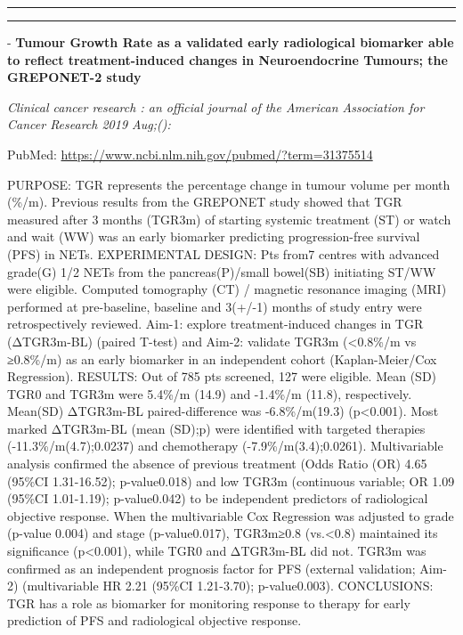 \documentclass[]{article}
\begin{document}
\begin{center}\rule{0.5\linewidth}{\linethickness}\end{center}

\begin{center}\rule{0.5\linewidth}{\linethickness}\end{center}

 - \textbf{Tumour Growth Rate as a validated early radiological
biomarker able to reflect treatment-induced changes in Neuroendocrine
Tumours; the GREPONET-2 study}

\emph{Clinical cancer research : an official journal of the American
Association for Cancer Research 2019 Aug;():}

PubMed: \url{https://www.ncbi.nlm.nih.gov/pubmed/?term=31375514}

PURPOSE: TGR represents the percentage change in tumour volume per month
(\%/m). Previous results from the GREPONET study showed that TGR
measured after 3 months (TGR3m) of starting systemic treatment (ST) or
watch and wait (WW) was an early biomarker predicting progression-free
survival (PFS) in NETs. EXPERIMENTAL DESIGN: Pts from7 centres with
advanced grade(G) 1/2 NETs from the pancreas(P)/small bowel(SB)
initiating ST/WW were eligible. Computed tomography (CT) / magnetic
resonance imaging (MRI) performed at pre-baseline, baseline and 3(+/-1)
months of study entry were retrospectively reviewed. Aim-1: explore
treatment-induced changes in TGR (ΔTGR3m-BL) (paired T-test) and Aim-2:
validate TGR3m (\textless{}0.8\%/m vs ≥0.8\%/m) as an early biomarker in
an independent cohort (Kaplan-Meier/Cox Regression). RESULTS: Out of 785
pts screened, 127 were eligible. Mean (SD) TGR0 and TGR3m were 5.4\%/m
(14.9) and -1.4\%/m (11.8), respectively. Mean(SD) ΔTGR3m-BL
paired-difference was -6.8\%/m(19.3) (p\textless{}0.001). Most marked
ΔTGR3m-BL (mean (SD);p) were identified with targeted therapies
(-11.3\%/m(4.7);0.0237) and chemotherapy (-7.9\%/m(3.4);0.0261).
Multivariable analysis confirmed the absence of previous treatment (Odds
Ratio (OR) 4.65 (95\%CI 1.31-16.52); p-value0.018) and low TGR3m
(continuous variable; OR 1.09 (95\%CI 1.01-1.19); p-value0.042) to be
independent predictors of radiological objective response. When the
multivariable Cox Regression was adjusted to grade (p-value 0.004) and
stage (p-value0.017), TGR3m≥0.8 (vs.\textless{}0.8) maintained its
significance (p\textless{}0.001), while TGR0 and ΔTGR3m-BL did not.
TGR3m was confirmed as an independent prognosis factor for PFS (external
validation; Aim-2) (multivariable HR 2.21 (95\%CI 1.21-3.70);
p-value0.003). CONCLUSIONS: TGR has a role as biomarker for monitoring
response to therapy for early prediction of PFS and radiological
objective response.
\end{document}
